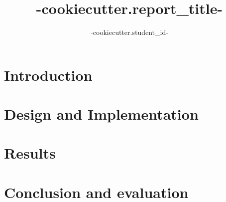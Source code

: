 \documentclass{SizheArticle}
\title{ {{-cookiecutter.report_title-}} }
\author{ {{-cookiecutter.student_id-}} }
\begin{document}
\tableofcontents

\section{Introduction}

\section{Design and Implementation}

\section{Results}

\section{Conclusion and evaluation}

\end{document}
